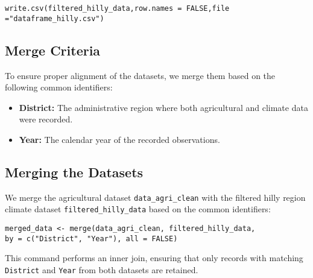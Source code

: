 \begin{verbatim}
write.csv(filtered_hilly_data,row.names = FALSE,file ="dataframe_hilly.csv")
\end{verbatim}

\subsection*{Merge Criteria}
To ensure proper alignment of the datasets, we merge them based on the following common identifiers:
\begin{itemize}
    \item \textbf{District:} The administrative region where both agricultural and climate data were recorded.
    \item \textbf{Year:} The calendar year of the recorded observations.
\end{itemize}

\subsection*{Merging the Datasets}
We merge the agricultural dataset \texttt{data\_agri\_clean} with the filtered hilly region climate dataset \texttt{filtered\_hilly\_data} based on the common identifiers:

\begin{verbatim}
merged_data <- merge(data_agri_clean, filtered_hilly_data, 
by = c("District", "Year"), all = FALSE) 
\end{verbatim}

This command performs an inner join, ensuring that only records with matching \texttt{District} and \texttt{Year} from both datasets are retained.
